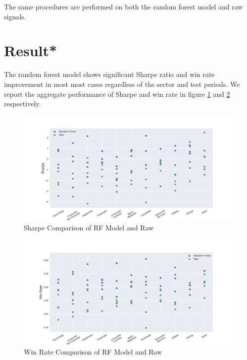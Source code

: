 \documentclass[12pt]{article}
\begin{document}
The same procedures are performed on both the random forest model and raw signals.


\section{Result*}

The random forest model shows significant Sharpe ratio and win rate improvement in most most cases regardless of the sector and test periods. We report the aggregate performance of Sharpe and win rate in figure \ref{fig:rf_raw_sharpe} and \ref{fig:rf_raw_win_rate} respectively.

\begin{figure}[ht]
  \begin{center}
    \includegraphics[width=1\linewidth]{figure/rf_raw_sharpe.png}
  \end{center}
  \caption{Sharpe Comparison of RF Model and Raw}
  \label{fig:rf_raw_sharpe}
\end{figure}

\begin{figure}[!ht]
  \begin{center}
    \includegraphics[width=1\linewidth]{figure/rf_raw_win_rate.png}
  \end{center}
  \caption{Win Rate Comparison of RF Model and Raw}
  \label{fig:rf_raw_win_rate}
\end{figure}
\end{document}
